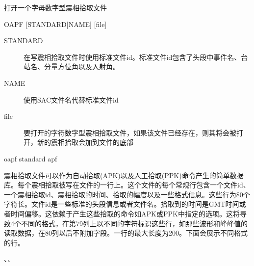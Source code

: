 \label{cmd:oapf}

打开一个字母数字型震相拾取文件

\begin{SACSTX}
OAPF [STANDARD|NAME] [file]
\end{SACSTX}

\begin{description}
\item [STANDARD] 在写震相拾取文件时使用标准文件id。标准文件id包含了头段中事件名、台站名、分量方位角以及入射角。
\item [NAME] 使用SAC文件名代替标准文件id
\item [file] 要打开的字符数字型震相拾取文件，如果该文件已经存在，则其将会被打开，新的震相拾取会加到文件的底部
\end{description}

\begin{SACDFT}
oapf standard apf
\end{SACDFT}

震相拾取文件可以作为自动拾取(APK)以及人工拾取(PPK)命令产生的简单数据库。每个震相拾取被写在文件的一行上。这个文件的每个常规行包含一个文件id、一个震相拾取id、震相拾取的时间、拾取的幅度以及一些格式信息。这些行为80个字符长。文件id是一些标准的头段信息或者文件名。拾取到的时间是GMT时间或者时间偏移。这依赖于产生这些拾取的命令如APK或PPK中指定的选项。这将导致4个不同的格式，在第79列上以不同的字符标识这些行，如那些波形和峰峰值的读取数据，在80列以后不附加字段。一行的最大长度为200。下面会展示不同格式的行。

、、

